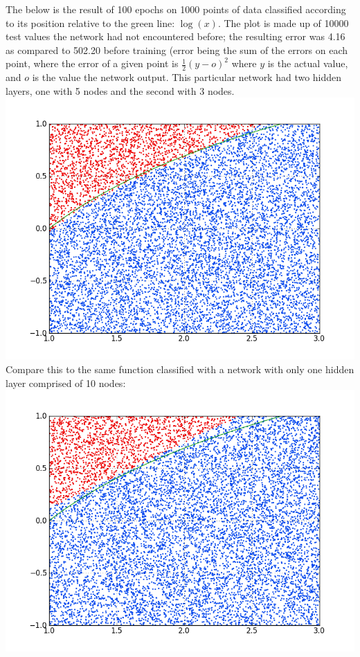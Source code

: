 \documentclass[12pt]{article}
\begin{document}
\begin{enumerate}
The below is the result of 100 epochs on 1000 points of data classified according to its position relative to the green line: $\log(x)$. The plot is made up of 10000 test values the network had not encountered before; the resulting error was 4.16 as compared to 502.20 before training (error being the sum of the errors on each point, where the error of a given point is $\frac{1}{2}(y-o)^2$ where $y$ is the actual value, and $o$ is the value the network output. This particular network had two hidden layers, one with 5 nodes and the second with 3 nodes.\\ 
\includegraphics[scale=0.5]{test.png}\\ 

Compare this to the same function classified with a network with only one hidden layer comprised of 10 nodes: \\ 
\includegraphics[scale=0.5]{test2.png}\\ 


\end{enumerate}
\end{document}
